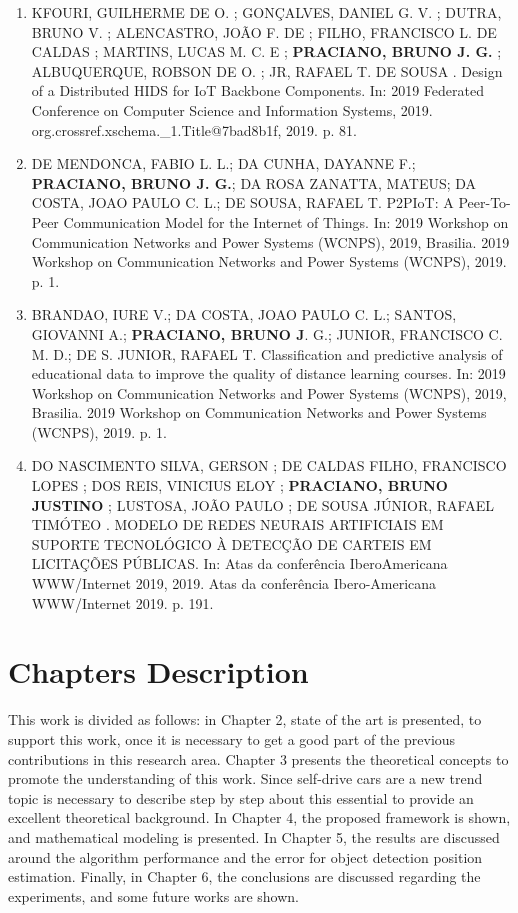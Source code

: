 \begin{enumerate}
\item KFOURI, GUILHERME DE O. ; GONÇALVES, DANIEL G. V. ; DUTRA, BRUNO V. ; ALENCASTRO, JOÃO F. DE ; FILHO, FRANCISCO L. DE CALDAS ; MARTINS, LUCAS M. C. E ; \textbf{PRACIANO, BRUNO J. G.} ; ALBUQUERQUE, ROBSON DE O. ; JR, RAFAEL T. DE SOUSA . Design of a Distributed HIDS for IoT Backbone Components. In: 2019 Federated Conference on Computer Science and Information Systems, 2019. org.crossref.xschema.\_1.Title@7bad8b1f, 2019. p. 81.

\item DE MENDONCA, FABIO L. L.; DA CUNHA, DAYANNE F.; \textbf{PRACIANO, BRUNO J. G.}; DA ROSA ZANATTA, MATEUS; DA COSTA, JOAO PAULO C. L.; DE SOUSA, RAFAEL T. P2PIoT: A Peer-To-Peer Communication Model for the Internet of Things. In: 2019 Workshop on Communication Networks and Power Systems (WCNPS), 2019, Brasilia. 2019 Workshop on Communication Networks and Power Systems (WCNPS), 2019. p. 1.

\item BRANDAO, IURE V.; DA COSTA, JOAO PAULO C. L.; SANTOS, GIOVANNI A.; \textbf{PRACIANO, BRUNO J}. G.; JUNIOR, FRANCISCO C. M. D.; DE S. JUNIOR, RAFAEL T. Classification and predictive analysis of educational data to improve the quality of distance learning courses. In: 2019 Workshop on Communication Networks and Power Systems (WCNPS), 2019, Brasilia. 2019 Workshop on Communication Networks and Power Systems (WCNPS), 2019. p. 1.


\item DO NASCIMENTO SILVA, GERSON ; DE CALDAS FILHO, FRANCISCO LOPES ; DOS REIS, VINICIUS ELOY ; \textbf{PRACIANO, BRUNO JUSTINO }; LUSTOSA, JOÃO PAULO ; DE SOUSA JÚNIOR, RAFAEL TIMÓTEO . MODELO DE REDES NEURAIS ARTIFICIAIS EM SUPORTE TECNOLÓGICO À DETECÇÃO DE CARTEIS EM LICITAÇÕES PÚBLICAS. In: Atas da conferência IberoAmericana WWW/Internet 2019, 2019. Atas da conferência Ibero-Americana WWW/Internet 2019. p. 191.

\end{enumerate}

\section{Chapters Description}

This work is divided as follows: in Chapter 2, state of the art is presented, to support this work, once it is necessary to get a good part of the previous contributions in this research area. Chapter 3 presents the theoretical concepts to promote the understanding of this work. Since self-drive cars are a new trend topic is necessary to describe step by step about this essential to provide an excellent theoretical background. In Chapter 4, the proposed framework is shown, and mathematical modeling is presented. In Chapter 5, the results are discussed around the algorithm performance and the error for object detection position estimation. Finally, in Chapter 6, the conclusions are discussed regarding the experiments, and some future works are shown.


